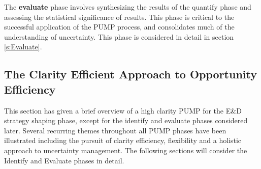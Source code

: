 The \textbf{evaluate} phase involves synthesizing the results of the quantify phase and assessing the statistical significance of results.
This phase is critical to the successful application of the PUMP process, and consolidates much of the understanding of uncertainty.
This phase is considered in detail in section \ref{s:Evaluate}.


\subsection{The Clarity Efficient Approach to Opportunity Efficiency}
This section has given a brief overview of a high clarity PUMP for the E\&D strategy shaping phase, except for the identify and evaluate phases considered later.
Several recurring themes throughout all PUMP phases have been illustrated including the pursuit of clarity efficiency, flexibility and a holistic approach to uncertainty management.
The following sections will consider the Identify and Evaluate phases in detail.


